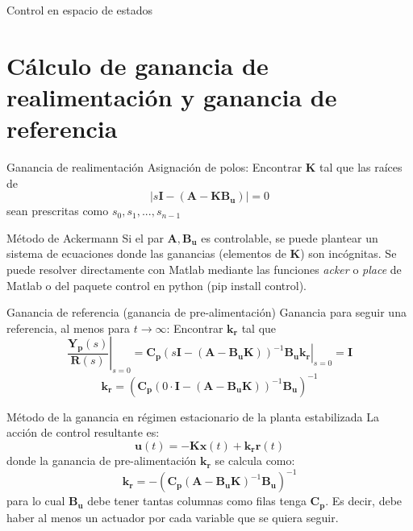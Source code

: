 \documentclass{beamer}
\begin{document}
\begin{frame}{Control en espacio de estados}
\end{frame}

\section{Cálculo de ganancia de realimentación y ganancia de referencia} 
\tableofcontents[currentsection]
\begin{frame}{Ganancia de realimentación}
Asignación de polos:
Encontrar $\mathbf{K}$ tal que las raíces de
$$|s\mathbf{I} - (\mathbf{A - KB_u})| = 0$$ sean prescritas como $s_0, s_1, ..., s_{n-1}$

\begin{block}{Método de Ackermann}
    Si el par $\mathbf{A}, \mathbf{B_u}$ es controlable, se puede plantear un sistema de ecuaciones donde las ganancias (elementos de $\mathbf{K}$) son incógnitas. Se puede resolver directamente con Matlab mediante las funciones \emph{acker} o \emph{place} de Matlab o del paquete control en python (pip install control).
\end{block}

\end{frame}

\begin{frame}{Ganancia de referencia (ganancia de pre-alimentación)}
Ganancia para seguir una referencia, al menos para $t \rightarrow \infty$: Encontrar $\mathbf{k_r}$ tal que
$$\left. \frac{\mathbf{Y_p}(s)}{\mathbf{R}(s)} \right|_{s=0} = \left. \mathbf{C_p} (s\mathbf{I} - (\mathbf{A} - \mathbf{B_u K}))^{-1} \mathbf{B_u k_r} \right|_{s=0} = \mathbf{I}$$
$$\mathbf{k_r} = (\mathbf{C_p}(0 \cdot \mathbf{I} - (\mathbf{A} - \mathbf{B_u K}))^{-1} \mathbf{B_u})^{-1}$$

\begin{block}{Método de la ganancia en régimen estacionario de la planta estabilizada}
    La acción de control resultante es:
    $$\mathbf{u}(t) = -\mathbf{Kx}(t) + \mathbf{k_r r}(t)$$
    donde la ganancia de pre-alimentación $\mathbf{k_r}$ se calcula como:
    $$\mathbf{k_r} =  -(\mathbf{C_p} (\mathbf{A} - \mathbf{B_u K})^{-1} \mathbf{B_u})^{-1}$$
    para lo cual $\mathbf{B_u}$ debe tener tantas columnas como filas tenga $\mathbf{C_p}$. Es decir, debe haber al menos un actuador por cada variable que se quiera seguir. 
\end{block}

\end{frame}


\end{document}
